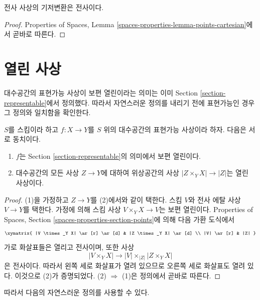 \begin{lemma}
\label{lemma-base-change-surjective}
전사 사상의 기저변환은 전사이다.
\end{lemma}

\begin{proof}
Properties of Spaces, Lemma
\ref{spaces-properties-lemma-points-cartesian}에서 곧바로 따른다.
\end{proof}










\section{열린 사상}
\label{section-open}

\noindent
대수공간의 표현가능 사상이 보편 열린이라는 의미는 이미
Section \ref{section-representable}에서 정의했다.
따라서 자연스러운 정의를 내리기 전에 표현가능인 경우 그 정의와
일치함을 확인한다.

\begin{lemma}
\label{lemma-characterize-representable-universally-open}
$S$를 스킴이라 하고 $f : X \to Y$를 $S$ 위의 대수공간의
표현가능 사상이라 하자. 다음은 서로 동치이다.
\begin{enumerate}
\item $f$는 Section \ref{section-representable}의 의미에서 보편 열린이다.
\item 대수공간의 모든 사상 $Z \to Y$에 대하여 위상공간의 사상
$|Z \times_Y X| \to |Z|$는 열린 사상이다.
\end{enumerate}
\end{lemma}

\begin{proof}
(1)을 가정하고 $Z \to Y$를 (2)에서와 같이 택한다.
스킴 $V$와 전사 에탈 사상 $V \to Y$를 택한다.
가정에 의해 스킴 사상 $V \times_Y X \to V$는 보편 열린이다.
Properties of Spaces, Section \ref{spaces-properties-section-points}에 의해
다음 가환 도식에서
$$
\xymatrix{
|V \times_Y X| \ar[r] \ar[d] & |Z \times_Y X| \ar[d] \\
|V| \ar[r] & |Z|
}
$$
가로 화살표들은 열리고 전사이며, 또한 사상
$$
|V \times_Y X| \longrightarrow |V| \times_{|Z|} |Z \times_Y X|
$$
은 전사이다. 따라서 왼쪽 세로 화살표가 열려 있으므로 오른쪽 세로
화살표도 열려 있다. 이것으로 (2)가 증명되었다.
(2) $\Rightarrow$ (1)은 정의에서 곧바로 따른다.
\end{proof}

\noindent
따라서 다음의 자연스러운 정의를 사용할 수 있다.

